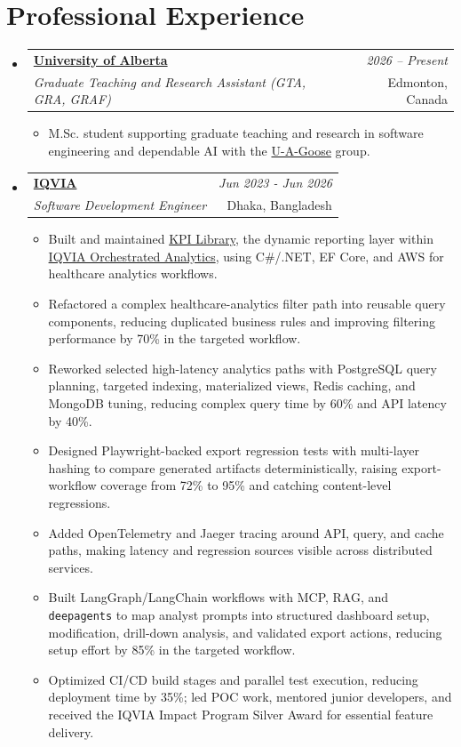 \documentclass[a4paper,11pt]{article}
\makeatletter
\newcommand{\resumeSubheading}[4]{
\vspace{0.5mm}\item
    \begin{tabular*}{0.98\textwidth}[t]{l@{\extracolsep{\fill}}r}
        \textbf{#1} & \textit{\footnotesize{#4}} \\
        \textit{\footnotesize{#3}} &  \footnotesize{#2}\\
    \end{tabular*}
    \vspace{-2.4mm}
}
\newcommand{\resumeSubHeadingListStart}{\begin{itemize}[leftmargin=*,labelsep=1mm]}
\newcommand{\resumeItemListStart}{\begin{itemize}[leftmargin=*,labelsep=1mm,itemsep=0.5mm]}
\newcommand{\resumeSubHeadingListEnd}{\end{itemize}\vspace{2mm}}
\newcommand{\resumeItemListEnd}{\end{itemize}\vspace{-2mm}}
\makeatother
\begin{document}
\section{\textbf{Professional Experience}}
\vspace{-0.4mm}
  \resumeSubHeadingListStart
  \resumeSubheading
      {\href{https://www.ualberta.ca/en/computing-science/index.html}{University of Alberta}}{Edmonton, Canada}
      {Graduate Teaching and Research Assistant (GTA, GRA, GRAF)}{2026 -- Present}
      \resumeItemListStart
        \item M.Sc. student supporting graduate teaching and research in software engineering and dependable AI with the \href{https://u-a-goose.github.io/}{U-A-Goose} group.
      \resumeItemListEnd
  \resumeSubheading
      {\href{https://www.iqvia.com/}{IQVIA}}{Dhaka, Bangladesh}
      {Software Development Engineer}{Jun 2023 - Jun 2026}
      \resumeItemListStart
        \item Built and maintained \href{https://www.iqvia.com/library/fact-sheets/kpi-library}{KPI Library}, the dynamic reporting layer within \href{https://www.iqvia.com/solutions/commercialization/commercial-analytics/orchestrated-analytics}{IQVIA Orchestrated Analytics}, using C\#/.NET, EF Core, and AWS for healthcare analytics workflows.
        \item Refactored a complex healthcare-analytics filter path into reusable query components, reducing duplicated business rules and improving filtering performance by 70\% in the targeted workflow.
        \item Reworked selected high-latency analytics paths with PostgreSQL query planning, targeted indexing, materialized views, Redis caching, and MongoDB tuning, reducing complex query time by 60\% and API latency by 40\%.
        \item Designed Playwright-backed export regression tests with multi-layer hashing to compare generated artifacts deterministically, raising export-workflow coverage from 72\% to 95\% and catching content-level regressions.
        \item Added OpenTelemetry and Jaeger tracing around API, query, and cache paths, making latency and regression sources visible across distributed services.
        \item Built LangGraph/LangChain workflows with MCP, RAG, and \texttt{deepagents} to map analyst prompts into structured dashboard setup, modification, drill-down analysis, and validated export actions, reducing setup effort by 85\% in the targeted workflow.
        \item Optimized CI/CD build stages and parallel test execution, reducing deployment time by 35\%; led POC work, mentored junior developers, and received the IQVIA Impact Program Silver Award for essential feature delivery.
      \resumeItemListEnd
  \resumeSubHeadingListEnd
\end{document}
